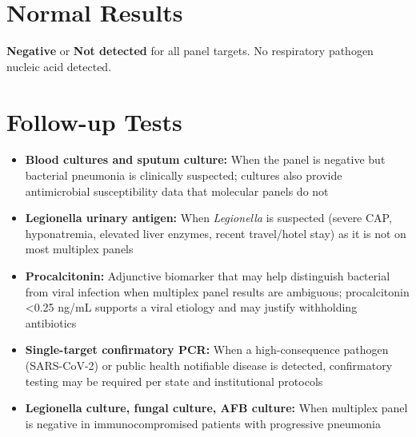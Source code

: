 \section*{Normal Results}
\textbf{Negative} or \textbf{Not detected} for all panel targets. No respiratory pathogen nucleic acid detected.

\section*{Follow-up Tests}
\begin{itemize}
  \item \textbf{Blood cultures and sputum culture:} When the panel is negative but bacterial pneumonia is clinically suspected; cultures also provide antimicrobial susceptibility data that molecular panels do not
  \item \textbf{Legionella urinary antigen:} When \textit{Legionella} is suspected (severe CAP, hyponatremia, elevated liver enzymes, recent travel/hotel stay) as it is not on most multiplex panels
  \item \textbf{Procalcitonin:} Adjunctive biomarker that may help distinguish bacterial from viral infection when multiplex panel results are ambiguous; procalcitonin <0.25 ng/mL supports a viral etiology and may justify withholding antibiotics
  \item \textbf{Single-target confirmatory PCR:} When a high-consequence pathogen (SARS-CoV-2) or public health notifiable disease is detected, confirmatory testing may be required per state and institutional protocols
  \item \textbf{Legionella culture, fungal culture, AFB culture:} When multiplex panel is negative in immunocompromised patients with progressive pneumonia
\end{itemize}


